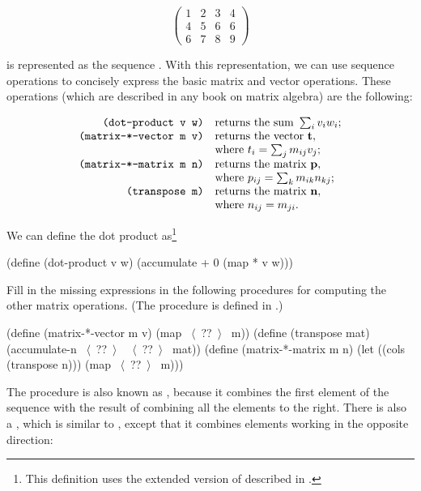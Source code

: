 \begin{exerciseGroup}
$$
\left(
\begin{array}{cccc}
  1 & 2 & 3 & 4 \\
  4 & 5 & 6 & 6 \\
  6 & 7 & 8 & 9
\end{array}
\right)
$$

\noindent
is represented as the sequence .  With
this representation, we can use sequence operations to concisely express the
basic matrix and vector operations.  These operations (which are described in
any book on matrix algebra) are the following:

$$
\begin{array}{rl}
	\text{\texttt{(dot-product v w)}} 		& \text{returns the sum } \sum_i v_i w_i; \\
	\text{\texttt{(matrix-*-vector m v)}} 	& \text{returns the vector } \mathbf{t},  \\
		& \text{where } t_i = \sum_j m_{ij} v_j;      \\
	\text{\texttt{(matrix-*-matrix m n)}} 	& \text{returns the matrix } \mathbf{p},  \\
		& \text{where } p_{ij} = \sum_k m_{ik} n_{kj};                          \\
	\text{\texttt{(transpose m)}} 		& \text{returns the matrix } \mathbf{n},  \\
		& \text{where } n_{ij} = m_{ji}.
\end{array}
$$

We can define the dot product as\footnote{This definition uses the extended
version of  described in .}

\begin{codeBlock}
(define (dot-product v w)
  (accumulate + 0 (map * v w)))
\end{codeBlock}

Fill in the missing expressions in the following procedures for computing the
other matrix operations.  (The procedure  is defined in
.)

\begin{codeBlock}
(define (matrix-*-vector m v)
  (map ~\(\langle \)~??~\(\rangle \)~ m))
(define (transpose mat)
  (accumulate-n ~\(\langle \)~??~\(\rangle \)~ ~\(\langle \)~??~\(\rangle \)~ mat))
(define (matrix-*-matrix m n)
  (let ((cols (transpose n)))
    (map ~\(\langle \)~??~\(\rangle \)~ m)))
\end{codeBlock}

\label{Exercise 2.38}
 The  procedure
is also known as , because it combines the first element of
the sequence with the result of combining all the elements to the right.  There
is also a , which is similar to , except that
it combines elements working in the opposite direction:


\end{exerciseGroup}
